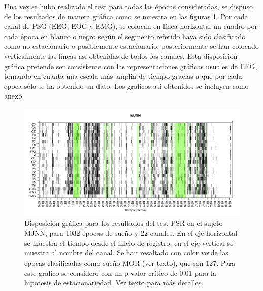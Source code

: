 Una vez se hubo realizado el test para todas las \'epocas consideradas, se dispuso de los 
resultados de manera gr\'afica  como se muestra en las figuras \ref{ejemplo1}.
Por cada canal de PSG (EEG, EOG y EMG), se colocan en l\'inea horizontal un cuadro por cada
\'epoca en blanco o negro seg\'un el segmento referido haya sido clasificado como
no-estacionario o posiblemente estacionario; posteriormente se han colocado verticalmente las
l\'ineas as\'i obtenidas de todos los canales.
Esta disposici\'on gr\'afica pretende ser consistente con las representaciones gr\'aficas
usuales de EEG, tomando en cuanta una escala m\'as amplia de tiempo gracias a que por
cada \'epoca s\'olo se ha obtenido un dato.
Los gr\'aficos as\'i obtenidos se incluyen como anexo.

\begin{figure}
\includegraphics[width=\textwidth]{MJNNVIGILOS_127_mor127_tot1032_esttotal.pdf} 
\caption{Disposici\'on gr\'afica para los resultados del test PSR en el sujeto MJNN, 
para 1032 \'epocas de sue\~no y 22 canales. 
En el eje horizontal se muestra el tiempo desde el inicio de registro, en el eje vertical se muestra al 
nombre del canal. 
Se han resaltado con color verde las \'epocas clasificadas como sue\~no MOR (ver texto), que son 127.
Para este gr\'afico se consider\'o con un p-valor cr\'itico de 0.01 para la hip\'otesis
de estacionariedad. Ver texto para m\'as detalles.}
\label{ejemplo1}
\end{figure}


